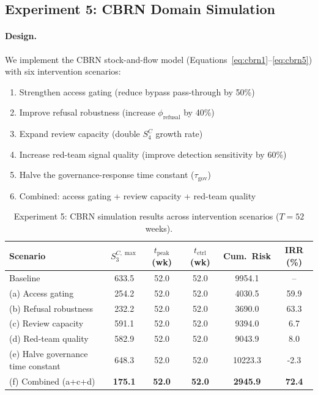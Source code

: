 \documentclass[11pt]{article}
\begin{document}
\subsection{Experiment 5: CBRN Domain Simulation}
\label{sec:exp5}

\paragraph{Design.} We implement the CBRN stock-and-flow model (Equations~\ref{eq:cbrn1}--\ref{eq:cbrn5}) with six intervention scenarios:

\begin{enumerate}[leftmargin=2em,itemsep=1pt,label=(\alph*)]
\item Strengthen access gating (reduce bypass pass-through by 50\%)
\item Improve refusal robustness (increase $\phi_{\text{refusal}}$ by 40\%)
\item Expand review capacity (double $S_4^C$ growth rate)
\item Increase red-team signal quality (improve detection sensitivity by 60\%)
\item Halve the governance-response time constant ($\tau_{\text{gov}}$)
\item Combined: access gating + review capacity + red-team quality
\end{enumerate}

\begin{table}[t]
\centering
\caption{Experiment 5: CBRN simulation results across intervention scenarios ($T = 52$ weeks).}
\label{tab:exp5}
\small
\begin{tabular}{@{}lccccc@{}}
\toprule
\textbf{Scenario} & $S_3^{C,\max}$ & $t_{\text{peak}}$ (wk) & $t_{\text{ctrl}}$ (wk) & Cum.\ Risk & IRR (\%) \\
\midrule
Baseline & 633.5 & 52.0 & 52.0 & 9954.1 & -- \\
(a) Access gating & 254.2 & 52.0 & 52.0 & 4030.5 & 59.9 \\
(b) Refusal robustness & 232.2 & 52.0 & 52.0 & 3690.0 & 63.3 \\
(c) Review capacity & 591.1 & 52.0 & 52.0 & 9394.0 & 6.7 \\
(d) Red-team quality & 582.9 & 52.0 & 52.0 & 9043.9 & 8.0 \\
(e) Halve governance time constant & 648.3 & 52.0 & 52.0 & 10223.3 & -2.3 \\
(f) Combined (a+c+d) & \textbf{175.1} & \textbf{52.0} & \textbf{52.0} & \textbf{2945.9} & \textbf{72.4} \\
\bottomrule
\end{tabular}
\end{table}
\end{document}
